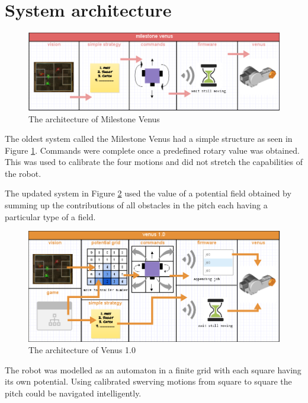 \documentclass[a4paper,12pt]{article}
\begin{document}
\cleardoublepage
{}
\tableofcontents
\cleardoublepage
{}

\newpage

\section{System architecture}

\begin{figure}
  \vspace{-12pt}
  \includegraphics[scale=0.35]{arch1.png}
  \vspace{-24pt}
  \caption{The architecture of Milestone Venus}
  \label{fig:milestone}
  \vspace{-18pt}
\end{figure}
The oldest system called the Milestone Venus had a simple structure as seen in Figure \ref{fig:milestone}. Commands were complete once a predefined rotary value was obtained. This was used to calibrate the four motions and did not stretch the capabilities of the robot.

The updated system in Figure \ref{fig:venus1} used the value of a potential field obtained by summing up the contributions of all obstacles in the pitch each having a particular type of a field.
\begin{figure}
  \vspace{-15pt}
  \includegraphics[scale=0.35]{arch2.png}
  \vspace{-24pt}
  \caption{The architecture of Venus 1.0}
  \label{fig:venus1}
  \vspace{-18pt}
\end{figure}
The robot was modelled as an automaton in a finite grid with each square having its own potential. Using calibrated swerving motions from square to square the pitch could be navigated intelligently.
\end{document}
